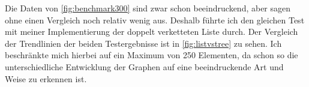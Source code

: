 \par
Die Daten von \autoref{fig:benchmark300} sind zwar schon beeindruckend, aber sagen ohne einen Vergleich noch relativ wenig aus. Deshalb führte ich den gleichen Test mit meiner Implementierung der doppelt verketteten Liste durch. Der Vergleich der Trendlinien der beiden Testergebnisse ist in \autoref{fig:listvstree} zu sehen. Ich beschränkte mich hierbei auf ein Maximum von 250 Elementen, da schon so die unterschiedliche Entwicklung der Graphen auf eine beeindruckende Art und Weise zu erkennen ist.

\begin{figure}
\end{figure}
